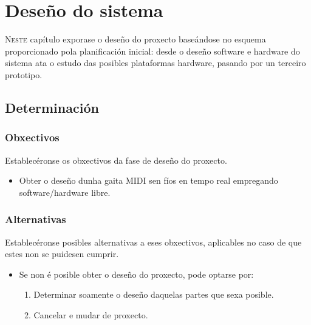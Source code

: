 \chapter{Deseño do sistema}
\minitoc
\label{chap:diseno}
\vspace{0.5cm}


\lettrine{N}{este} capítulo exporase o deseño do proxecto baseándose no esquema
proporcionado pola planificación inicial: desde o deseño software e hardware do
sistema ata o estudo das posibles plataformas hardware, pasando por un terceiro
prototipo.

\section{Determinación}

 \subsection{Obxectivos}

 Establecéronse os obxectivos da fase de deseño do proxecto.

 \begin{itemize}
  \item Obter o deseño dunha gaita MIDI sen fíos en tempo real empregando
        software/hardware libre.
 \end{itemize}

 \subsection{Alternativas}

 Establecéronse posibles alternativas a eses obxectivos, aplicables no caso de
 que estes non se puidesen cumprir.

 \begin{itemize}
  \item Se non é posible obter o deseño do proxecto, pode optarse por:
        \begin{enumerate}
         \item Determinar soamente o deseño daquelas partes que sexa posible.
         \item Cancelar e mudar de proxecto.
        \end{enumerate}
 \end{itemize}

